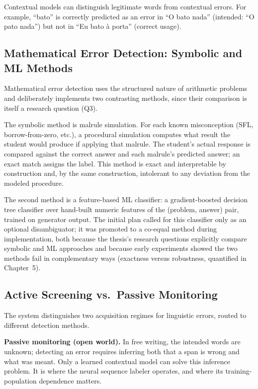 Contextual models can distinguish legitimate words from contextual errors. For example, ``bato'' is correctly predicted as an error in ``O bato nada'' (intended: ``O pato nada'') but not in ``Eu bato à porta'' (correct usage).

\subsection{Mathematical Error Detection: Symbolic and ML Methods}
\label{sec:method_models_math}

Mathematical error detection uses the structured nature of arithmetic problems and deliberately implements two contrasting methods, since their comparison is itself a research question (Q3).

The symbolic method is malrule simulation. For each known misconception (SFL, borrow-from-zero, etc.), a procedural simulation computes what result the student would produce if applying that malrule. The student's actual response is compared against the correct answer and each malrule's predicted answer; an exact match assigns the label. This method is exact and interpretable by construction and, by the same construction, intolerant to any deviation from the modeled procedure.

The second method is a feature-based ML classifier: a gradient-boosted decision tree classifier over hand-built numeric features of the (problem, answer) pair, trained on generator output. The initial plan called for this classifier only as an optional disambiguator; it was promoted to a co-equal method during implementation, both because the thesis's research questions explicitly compare symbolic and ML approaches and because early experiments showed the two methods fail in complementary ways (exactness versus robustness, quantified in Chapter~5).

\subsection{Active Screening vs.\ Passive Monitoring}
\label{sec:method_models_screening}

The system distinguishes two acquisition regimes for linguistic errors, routed to different detection methods.

\textbf{Passive monitoring (open world).} In free writing, the intended words are unknown; detecting an error requires inferring both that a span is wrong and what was meant. Only a learned contextual model can solve this inference problem. It is where the neural sequence labeler operates, and where its training-population dependence matters.

